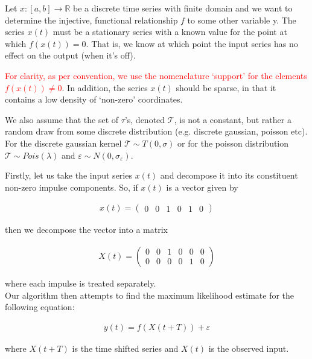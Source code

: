 \documentclass[11pt]{amsart}
\begin{document}
Let $x: [a, b] \longrightarrow \mathbb{R}$ be a discrete time series with finite domain and we want to determine the injective, functional relationship $f$ to some other variable y. The series $x(t)$ must be a stationary series with a known value for the point at which $f(x(t)) = 0$.  That is, we know at which point the input series has no effect on the output (when it’s off). 

\textcolor{red}{For clarity, as per convention, we use the nomenclature ‘support’ for the elements $f(x(t)) \neq 0$}. In addition, the series $x(t)$ should be sparse, in that it contains a low density of ‘non-zero’ coordinates. 

We also assume that the set of $\tau$'s, denoted $\mathcal{T}$, is not a constant, but rather a random draw from some discrete distribution (e.g. discrete gaussian, poisson etc). For the discrete gaussian kernel $\mathcal{T}\sim T(0, \sigma)$ or for the poisson distribution $\mathcal{T}\sim Pois(\lambda)$ and $\varepsilon \sim N(0, \sigma_{\varepsilon})$. 

Firstly, let us take the input series $x(t)$ and decompose it into its constituent non-zero impulse components. So, if $x(t)$ is a vector given by 

\begin{align}
x(t) = 
\left(
\begin{array}{cccccc}
0 & 0 & 1 & 0 & 1 & 0
\end{array}  
\right)
\end{align}

then we decompose the vector into a matrix 

\begin{align}
X(t) = 
\left(
\begin{array}{cccccc}
0 & 0 & 1 & 0 & 0 & 0 \\
0 & 0 & 0 & 0 & 1 & 0 
\end{array}  
\right)
\end{align}

where each impulse is treated separately. \\

Our algorithm then attempts to find the maximum likelihood estimate for the following equation:

\begin{align}
y(t)= f(X(t + T)) + \varepsilon
\end{align}

where $X(t + T)$ is the time shifted series and $X(t)$ is the observed input.\\
\end{document}
